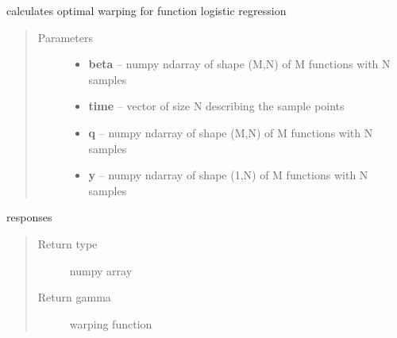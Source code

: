 \documentclass[letterpaper,10pt,english]{sphinxmanual}
\begin{document}

\begin{fulllineitems}
\label{regression:regression.logistic_warp}
calculates optimal warping for function logistic regression
\begin{quote}\begin{description}
\item[{Parameters}] \leavevmode\begin{itemize}
\item {} 
\textbf{beta} -- numpy ndarray of shape (M,N) of M functions with N samples

\item {} 
\textbf{time} -- vector of size N describing the sample points

\item {} 
\textbf{q} -- numpy ndarray of shape (M,N) of M functions with N samples

\item {} 
\textbf{y} -- numpy ndarray of shape (1,N) of M functions with N samples

\end{itemize}

\end{description}\end{quote}

responses
\begin{quote}\begin{description}
\item[{Return type}] \leavevmode
numpy array

\item[{Return gamma}] \leavevmode
warping function

\end{description}\end{quote}

\end{fulllineitems}

\end{document}
